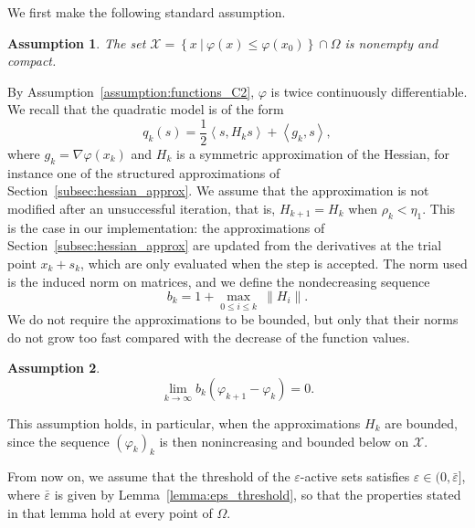 \documentclass{article}
\numberwithin{equation}{section}
\newcommand{\calX}{{\mathcal{X}}}
\newcommand{\inner}[2]{\left\langle {#1} , {#2} \right\rangle} %
\newcommand{\rev}[1]{#1}
\theoremstyle{plain}
\newtheorem{assumption}{Assumption}
\begin{document}
We first make the following standard assumption.
\begin{assumption}\label{assumption:inner_iterates_compact}
	The set $\calX = \left\{x \ | \ \varphi(x) \le \varphi(x_0)\right\} \cap \Omega$ is nonempty and compact.
\end{assumption}
By Assumption~\ref{assumption:functions_C2}, $\varphi$ is twice continuously differentiable. We recall that the quadratic model is of the form
\[q_k(s) = \dfrac{1}{2} \inner{s}{H_ks} + \inner{g_k}{s},\]
where $g_k = \nabla \varphi(x_k)$ and $H_k$ is a symmetric approximation of the Hessian, for instance one of the structured approximations of Section~\ref{subsec:hessian_approx}. \rev{We assume that the approximation is not modified after an unsuccessful iteration, that is, $H_{k+1} = H_k$ when $\rho_k < \eta_1$. This is the case in our implementation: the approximations of Section~\ref{subsec:hessian_approx} are updated from the derivatives at the trial point $x_k+s_k$, which are only evaluated when the step is accepted.} The norm used is the induced norm on matrices, and we define the nondecreasing sequence
\[b_k = 1+\max_{0 \le i \le k} \ \left\| H_i\right\|.\]
We do not require the approximations to be bounded, but only that their norms do not grow too fast compared with the decrease of the function values.
\begin{assumption}\label{assumption:hessian_norm_compared_convergence_speed}
	\[\lim\limits_{k\to \infty} b_k (\varphi_{k+1}-\varphi_k) = 0.\]
\end{assumption}
This assumption holds, in particular, when the approximations $H_k$ are bounded, since the sequence $(\varphi_k)_k$ is then nonincreasing and bounded below on $\calX$.

From now on, we assume that the threshold of the $\varepsilon$-active sets satisfies $\varepsilon \in (0,\bar\varepsilon]$, where $\bar\varepsilon$ is given by Lemma~\ref{lemma:eps_threshold}, so that the properties stated in that lemma hold at every point of $\Omega$.
\end{document}
